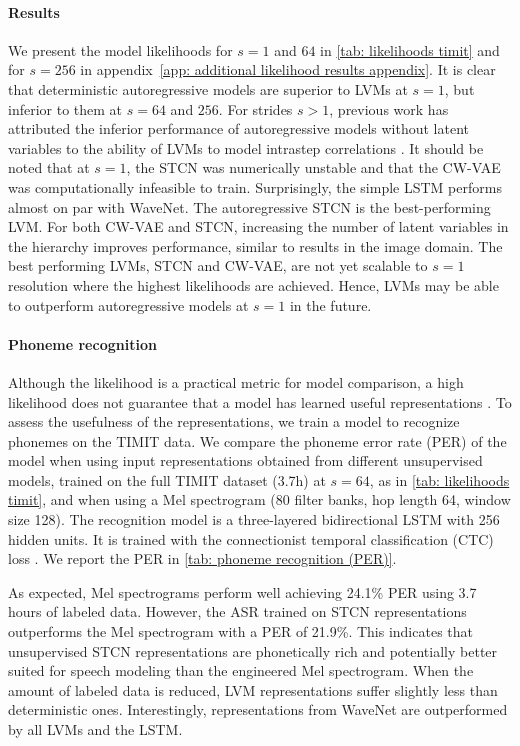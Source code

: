 {\paragraph{Results}
We present the model likelihoods for $s=1$ and $64$ in \cref{tab: likelihoods timit} and for $s=256$ in appendix~\cref{app: additional likelihood results appendix}. It is clear that deterministic autoregressive models are superior to LVMs at $s=1$, but inferior to them at $s=64$ and $256$. For strides $s>1$, previous work has attributed the inferior performance of autoregressive models without latent variables to the ability of LVMs to model intrastep correlations \parencite{lai_re-examination_2019}. It should be noted that at $s=1$, the STCN was numerically unstable and that the CW-VAE was computationally infeasible to train.
%
Surprisingly, the simple LSTM performs almost on par with WaveNet. The autoregressive STCN is the best-performing LVM. For both CW-VAE and STCN, increasing the number of latent variables in the hierarchy improves performance, similar to results in the image domain. 
The best performing LVMs, STCN and CW-VAE, are not yet scalable to $s=1$ resolution where the highest likelihoods are achieved. Hence, LVMs may be able to outperform autoregressive models at $s=1$ in the future.

\paragraph{Phoneme recognition}
Although the likelihood is a practical metric for model comparison, a high likelihood does not guarantee that a model has learned useful representations \parencite{huszar_is_2017}. To assess the usefulness of the representations, we train a model to recognize phonemes on the TIMIT data. We compare the phoneme error rate (PER) of the model when using input representations obtained from different unsupervised models, trained on the full TIMIT dataset (3.7h) at $s=64$, as in \cref{tab: likelihoods timit}, and when using a Mel spectrogram (80 filter banks, hop length 64, window size 128). The recognition model is a three-layered bidirectional LSTM with 256 hidden units. It is trained with the connectionist temporal classification (CTC) loss \parencite{graves_connectionist_2006}. We report the PER in \cref{tab: phoneme recognition (PER)}.

As expected, Mel spectrograms perform well achieving 24.1\% PER using 3.7 hours of labeled data. However, the ASR trained on STCN representations outperforms the Mel spectrogram with a PER of 21.9\%. 
This indicates that unsupervised STCN representations are phonetically rich and potentially better suited for speech modeling than the engineered Mel spectrogram. 
When the amount of labeled data is reduced, LVM representations suffer slightly less than deterministic ones. Interestingly, representations from WaveNet are outperformed by all LVMs and the LSTM. 


}
